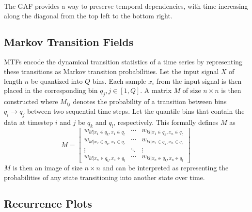 The GAF provides a way to preserve temporal dependencies, with time increasing along the diagonal from the top left to the bottom right.

\subsection{Markov Transition Fields}

MTFs \cite{wang2015imaging} encode the dynamical transition statistics of a time series by representing these transitions as Markov transition probabilities.
Let the input signal $X$ of length $n$ be quantized into $Q$ bins.
Each sample $x_i$ from the input signal is then placed in the corresponding bin $q_j, j \in [1, Q]$.
A matrix $M$ of size $n \times n$ is then constructed where $M_{ij}$ denotes the probability of a transition between bins $q_i \rightarrow q_j$ between two sequential time steps. 
Let the quantile bins that contain the data at timestep $i$ and $j$ be $q_k$ and $q_l$, respectively.
This formally defines $M$ as
\begin{equation}
	M = \begin{bmatrix}
			w_{kl|x_1 \in q_k, x_1 \in q_l} & \cdots & w_{kl|x_1 \in q_k, x_n \in q_l} \\
			w_{kl|x_2 \in q_k, x_1 \in q_l} & \cdots & w_{kl|x_2 \in q_k, x_n \in q_l} \\
			\vdots                          & \ddots & \vdots                          \\
			w_{kl|x_n \in q_k, x_1 \in q_l} & \cdots & w_{kl|x_n \in q_k, x_n \in q_l}
		\end{bmatrix}
\end{equation}
$M$ is then an image of size $n \times n$ and can be interpreted as representing the probabilities of any state transitioning into another state over time.

\subsection{Recurrence Plots}

